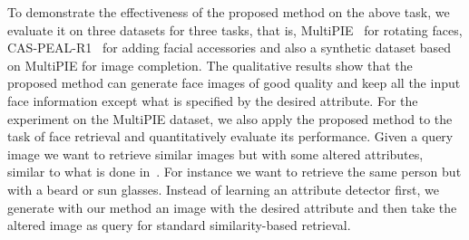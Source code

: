 \documentclass[10pt,twocolumn,letterpaper]{article}
\begin{document}
To demonstrate the effectiveness of the proposed method on the above task, 
we evaluate it on three datasets for three tasks, that is, MultiPIE~\cite{multipie} for rotating faces, CAS-PEAL-R1~\cite{caspeal} for adding facial accessories and also a synthetic dataset based on MultiPIE for image completion.
The qualitative results show that the proposed method can generate face images of good quality and keep all the input face information except what is specified by the desired attribute.
For the experiment on the MultiPIE dataset, we also apply the proposed method to the task of face retrieval and quantitatively evaluate its performance.
Given a query image we want to retrieve similar images but with some altered attributes, similar to what is done in~\cite{Ghodrati-icmr15}. 
For instance we want to retrieve the same person but with a beard or sun glasses. 
Instead of learning an attribute detector first, we generate with our method an image with the desired attribute and then take the altered image as query for standard similarity-based retrieval.
\end{document}
